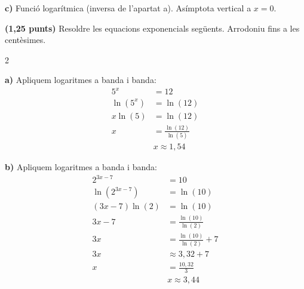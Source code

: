 \documentclass[12pt,a4paper]{exam}
\begin{document}
\begin{questions}
\begin{solution}
    \textbf{c)} Funció logarítmica (inversa de l'apartat a). Asímptota vertical a $x=0$.
    \begin{center}
    \end{center}
\end{solution}

\question \textbf{(1,25 punts)} Resoldre les equacions exponencials següents. Arrodoniu fins a les centèsimes.
\begin{multicols}{2}
\end{multicols}
\begin{solution}
    \textbf{a)} Apliquem logaritmes a banda i banda:
    \begin{align*}
        5^x &= 12 \\
        \ln(5^x) &= \ln(12) \\
        x \ln(5) &= \ln(12) \\
        x &= \frac{\ln(12)}{\ln(5)} \\
        &\boxed{x \approx 1,54}
    \end{align*}
    
    \textbf{b)} Apliquem logaritmes a banda i banda:
    \begin{align*}
        2^{3x-7} &= 10 \\
        \ln(2^{3x-7}) &= \ln(10) \\
        (3x-7) \ln(2) &= \ln(10) \\
        3x - 7 &= \frac{\ln(10)}{\ln(2)} \\
        3x &= \frac{\ln(10)}{\ln(2)} + 7 \\
        3x &\approx 3,32 + 7 \\
        x &= \frac{10,32}{3} \\
        &\boxed{x \approx 3,44}
    \end{align*}
\end{solution}


\end{questions}
\end{document}
